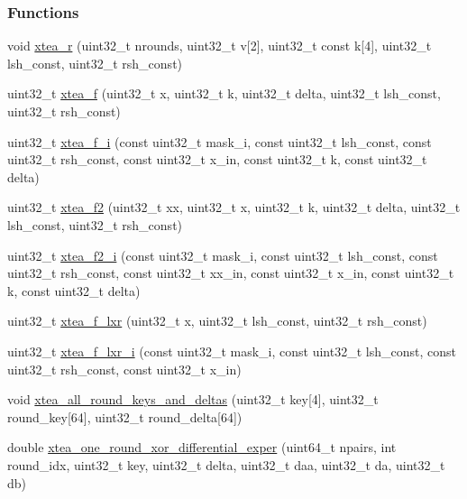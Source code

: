 \subsubsection*{\-Functions}
\begin{DoxyCompactItemize}
\item 
void \hyperlink{xtea_8hh_adaa7278f73e75111495290f343026090}{xtea\-\_\-r} (uint32\-\_\-t nrounds, uint32\-\_\-t v\mbox{[}2\mbox{]}, uint32\-\_\-t const k\mbox{[}4\mbox{]}, uint32\-\_\-t lsh\-\_\-const, uint32\-\_\-t rsh\-\_\-const)
\item 
uint32\-\_\-t \hyperlink{xtea_8hh_a6c0b7a7bc47458fb343e66188fe4abda}{xtea\-\_\-f} (uint32\-\_\-t x, uint32\-\_\-t k, uint32\-\_\-t delta, uint32\-\_\-t lsh\-\_\-const, uint32\-\_\-t rsh\-\_\-const)
\item 
uint32\-\_\-t \hyperlink{xtea_8hh_ab00b318c2b52da3411e776ecad9cc654}{xtea\-\_\-f\-\_\-i} (const uint32\-\_\-t mask\-\_\-i, const uint32\-\_\-t lsh\-\_\-const, const uint32\-\_\-t rsh\-\_\-const, const uint32\-\_\-t x\-\_\-in, const uint32\-\_\-t k, const uint32\-\_\-t delta)
\item 
uint32\-\_\-t \hyperlink{xtea_8hh_a3ff97f349faa35a728c6cdd128fca853}{xtea\-\_\-f2} (uint32\-\_\-t xx, uint32\-\_\-t x, uint32\-\_\-t k, uint32\-\_\-t delta, uint32\-\_\-t lsh\-\_\-const, uint32\-\_\-t rsh\-\_\-const)
\item 
uint32\-\_\-t \hyperlink{xtea_8hh_a9f0820f683a096de3cef79c742f5e96d}{xtea\-\_\-f2\-\_\-i} (const uint32\-\_\-t mask\-\_\-i, const uint32\-\_\-t lsh\-\_\-const, const uint32\-\_\-t rsh\-\_\-const, const uint32\-\_\-t xx\-\_\-in, const uint32\-\_\-t x\-\_\-in, const uint32\-\_\-t k, const uint32\-\_\-t delta)
\item 
uint32\-\_\-t \hyperlink{xtea_8hh_a54a13074da03742ac10ea2ea5f7eec0e}{xtea\-\_\-f\-\_\-lxr} (uint32\-\_\-t x, uint32\-\_\-t lsh\-\_\-const, uint32\-\_\-t rsh\-\_\-const)
\item 
uint32\-\_\-t \hyperlink{xtea_8hh_a1823edb609314578f37b3a27a6043f07}{xtea\-\_\-f\-\_\-lxr\-\_\-i} (const uint32\-\_\-t mask\-\_\-i, const uint32\-\_\-t lsh\-\_\-const, const uint32\-\_\-t rsh\-\_\-const, const uint32\-\_\-t x\-\_\-in)
\item 
void \hyperlink{xtea_8hh_a109868d39fb2ef2c5a3cc53c084481e1}{xtea\-\_\-all\-\_\-round\-\_\-keys\-\_\-and\-\_\-deltas} (uint32\-\_\-t key\mbox{[}4\mbox{]}, uint32\-\_\-t round\-\_\-key\mbox{[}64\mbox{]}, uint32\-\_\-t round\-\_\-delta\mbox{[}64\mbox{]})
\item 
double \hyperlink{xtea_8hh_aa3d72e07a53369bafdee493b8f566460}{xtea\-\_\-one\-\_\-round\-\_\-xor\-\_\-differential\-\_\-exper} (uint64\-\_\-t npairs, int round\-\_\-idx, uint32\-\_\-t key, uint32\-\_\-t delta, uint32\-\_\-t daa, uint32\-\_\-t da, uint32\-\_\-t db)

\end{DoxyCompactItemize}
